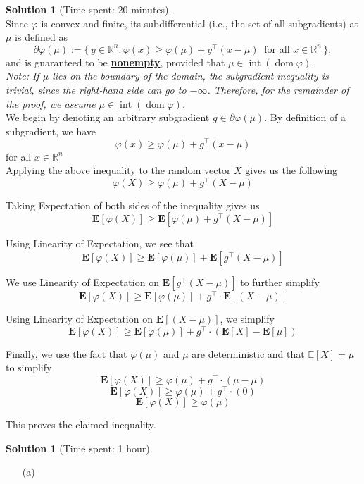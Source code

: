 \documentclass[11pt, reqno, letterpaper, twoside]{amsart}
\theoremstyle{plain}
\theoremstyle{definition}
\newtheorem{solution}[theorem]{Solution}
\begin{document}
\clearpage
\begin{solution}[Time spent: 20 minutes] \\
Since $\varphi$ is convex and finite, its subdifferential (i.e., the set of all subgradients) at $\mu$ is defined as
\[
\partial \varphi(\mu) := \{\, y \in \mathbb{R}^n : \varphi(x) \geq \varphi(\mu) + y^\top (x - \mu) \;\; \text{for all } x \in \mathbb{R}^n \,\},
\]
and is guaranteed to be \textbf{\underline{nonempty}}, provided that $\mu \in \operatorname{int}(\operatorname{dom}\varphi)$. \\

\noindent \textit{Note: If $\mu$ lies on the boundary of the domain, the subgradient inequality is trivial, since the right-hand side can go to $-\infty$. Therefore, for the remainder of the proof, we assume $\mu \in \operatorname{int}(\operatorname{dom}\varphi)$.} \\



\noindent We begin by denoting an arbitrary subgradient $g \in \partial \varphi(\mu)$. By definition of a subgradient, we have
\[
\varphi(x)\ge \varphi(\mu)+ g^\top \left(x-\mu\right)
\]
for all $x \in \mathbb{R}^n$ \\

Applying the above inequality to the random vector \(X\) gives us the following
\[
\varphi(X)\ge \varphi(\mu)+ g^\top \left(X-\mu\right)
\]

Taking Expectation of both sides of the inequality gives us 
\[
\mathbf{E} \left[ \varphi(X) \right]\ge \mathbf{E} \left[ \varphi(\mu)+ g^\top \left(X-\mu\right) \right]
\]

Using Linearity of Expectation, we see that
\[
\mathbf{E} \left[ \varphi(X) \right]\ge \mathbf{E} \left[ \varphi(\mu) \right] + \mathbf{E} \left[ g^\top \left(X-\mu\right) \right]
\]

We use Linearity of Expectation on $\mathbf{E} \left[ g^\top \left(X-\mu\right) \right]$ to further simplify
\[
\mathbf{E} \left[ \varphi(X) \right]\ge \mathbf{E} \left[ \varphi(\mu) \right] + g^\top \cdot \mathbf{E} \left[\left(X-\mu\right) \right]
\]

Using Linearity of Expectation on $\mathbf{E} \left[\left(X-\mu\right) \right]$, we simplify 
\[
\mathbf{E} \left[ \varphi(X) \right]\ge \mathbf{E} \left[ \varphi(\mu) \right] + g^\top \cdot \left( \mathbf{E} \left[X \right] - \mathbf{E} \left[\mu \right] \right)
\]

Finally, we use the fact that $\varphi(\mu)$ and $\mu$ are deterministic and that \(\mathbb{E}[X]=\mu\) to simplify
\[
\mathbf{E} \left[ \varphi(X) \right]\ge \varphi(\mu) + g^\top \cdot \left( \mu - \mu \right)
\]
\[
\mathbf{E} \left[ \varphi(X) \right]\ge \varphi(\mu) + g^\top \cdot \left( 0 \right)
\]
\[
\mathbf{E} \left[ \varphi(X) \right]\ge \varphi(\mu)
\]

This proves the claimed inequality.

\end{solution}

\clearpage
\begin{solution}[Time spent: 1 hour]
\begin{enumerate}
    \item[(a)]
\end{enumerate}
\end{solution}
\end{document}

